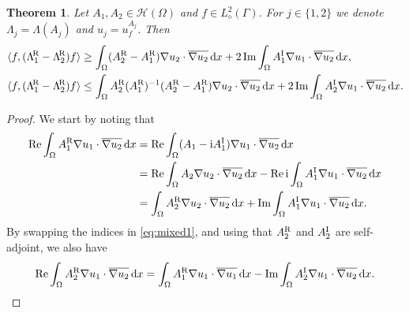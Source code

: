 \documentclass[reqno]{amsart}
\numberwithin{equation}{section}
\numberwithin{figure}{section}
\numberwithin{table}{section}
\theoremstyle{plain}
\newtheorem{theorem}{Theorem}[section]
\theoremstyle{definition}
\theoremstyle{remark}
\newcommand{\inner}[1]{\langle#1\rangle}
\newcommand{\redel}{\mathop{\textup{Re}}}
\newcommand{\imdel}{\mathop{\textup{Im}}}
\newcommand{\I}{\mathrm{i}}    %
\newcommand{\di}{\mathrm{d}}   %
\newcommand{\upR}{^{\textup{R}}}
\newcommand{\upI}{^{\textup{I}}}
\newcommand{\uptR}{^{\!\textup{R}}}
\newcommand{\LambdaR}{\Lambda\uptR}
\newcommand{\AR}{A\upR}
\newcommand{\AI}{A\upI}
\begin{document}
	\begin{theorem}\label{thm:improvedmono}
		Let $A_1,A_2\in\mathcal{H}(\Omega)$ and $f\in L^2_\diamond(\Gamma)$. For $j\in\{1,2\}$ we denote $\Lambda_j = \Lambda(A_j)$ and $u_j = u_f^{A_j}$. Then
		\begin{align*}
			\inner{f,(\LambdaR_1-\LambdaR_2) f} &\geq \int_\Omega (\AR_2-\AR_1)\nabla u_2\cdot \overline{\nabla u_2}\,\di x + 2\imdel\int_\Omega \AI_1\nabla u_1\cdot\overline{\nabla u_2}\,\di x,  \\
			\inner{f,(\LambdaR_1-\LambdaR_2) f} &\leq \int_\Omega \AR_2(\AR_1)^{-1}(\AR_2-\AR_1)\nabla u_2\cdot\overline{\nabla u_2}\,\di x + 2\imdel \int_\Omega \AI_2\nabla u_1\cdot\overline{\nabla u_2}\,\di x.
		\end{align*}
	\end{theorem}
	\begin{proof}
		We start by noting that 
		\begin{align} \label{eq:mixed1}
			\redel \int_\Omega \AR_1\nabla u_1\cdot\overline{\nabla u_2}\,\di x &= \redel \int_\Omega (A_1 - \I \AI_1)\nabla u_1\cdot\overline{\nabla u_2}\,\di x \notag \\
			&= \redel \int_\Omega A_2\nabla u_2\cdot\overline{\nabla u_2}\,\di x - \redel \I\int_\Omega \AI_1\nabla u_1\cdot\overline{\nabla u_2}\,\di x \notag \\
			&= \int_\Omega \AR_2 \nabla u_2\cdot\overline{\nabla u_2}\,\di x + \imdel \int_\Omega \AI_1 \nabla u_1\cdot\overline{\nabla u_2}\,\di x.
		\end{align}
		By swapping the indices in \eqref{eq:mixed1}, and using that $\AR_2$ and $\AI_2$ are self-adjoint, we also have
		\begin{equation} \label{eq:mixed2}
			\redel \int_\Omega \AR_2\nabla u_1\cdot\overline{\nabla u_2}\,\di x = \int_\Omega \AR_1 \nabla u_1\cdot\overline{\nabla u_1}\,\di x - \imdel \int_\Omega \AI_2 \nabla u_1\cdot\overline{\nabla u_2}\,\di x.
		\end{equation}
		

\end{proof}
\end{document}
